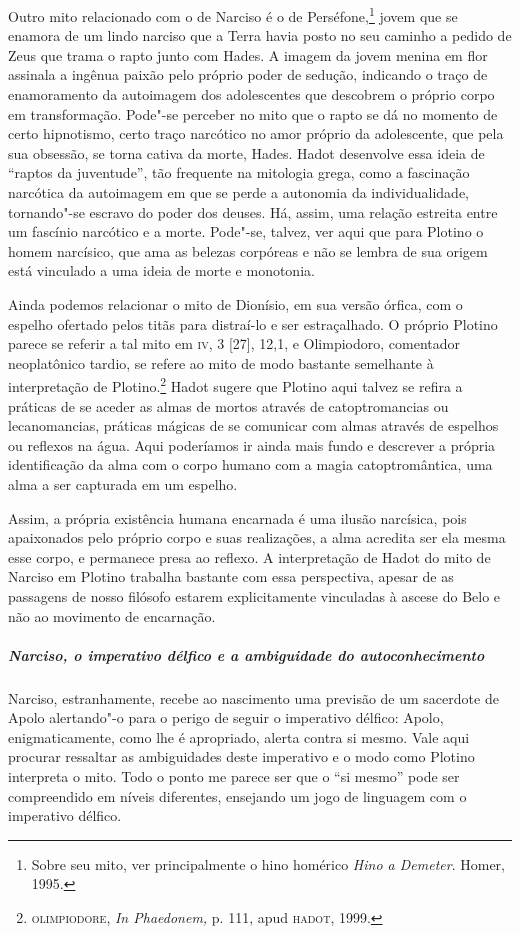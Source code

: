 Outro mito relacionado com o de Narciso é o de Perséfone,\footnote{
Sobre seu mito, ver principalmente o hino homérico \emph{Hino a
Demeter}. Homer, 1995.} jovem que se enamora de um lindo narciso que
a Terra havia posto no seu caminho a pedido de Zeus que trama o rapto
junto com Hades. A imagem da jovem menina em flor assinala a ingênua
paixão pelo próprio poder de sedução, indicando o traço de
enamoramento da autoimagem dos adolescentes que descobrem o próprio
corpo em transformação. Pode"-se perceber no mito que o rapto se dá no
momento de certo hipnotismo, certo traço narcótico no amor próprio da
adolescente, que pela sua obsessão, se torna cativa da morte, Hades.
Hadot desenvolve essa ideia de “raptos da juventude”, tão frequente
na mitologia grega, como a fascinação narcótica da autoimagem em que
se perde a autonomia da individualidade, tornando"-se escravo do poder
dos deuses. Há, assim, uma relação estreita entre um fascínio
narcótico e a morte. Pode"-se, talvez, ver aqui que para Plotino o
homem narcísico, que ama as belezas corpóreas e não se lembra de sua
origem está vinculado a uma ideia de morte e monotonia.

Ainda podemos relacionar o mito de Dionísio, em sua versão
órfica,
com o espelho ofertado pelos titãs para distraí-lo e ser
estraçalhado. O próprio Plotino parece se referir a tal mito em
\textsc{iv}, 3
[27], 12,1, e Olimpiodoro, comentador neoplatônico tardio, se refere
ao mito de modo bastante semelhante à interpretação de
Plotino.\footnote{ \textsc{olimpiodore}, \emph{In Phaedonem,} p. 111, apud
\textsc{hadot}, 1999.} Hadot sugere que Plotino aqui talvez se refira a
práticas de se aceder as almas de mortos através de catoptromancias ou
lecanomancias, práticas mágicas de se comunicar com almas através de
espelhos ou reflexos na água. Aqui poderíamos ir ainda mais fundo e
descrever a própria identificação da alma com o corpo humano com a
magia catoptromântica, uma alma a ser capturada em um espelho. 

Assim, a própria existência humana encarnada é uma ilusão
narcísica, pois apaixonados pelo próprio corpo e suas realizações, a
alma acredita ser ela mesma esse corpo, e permanece presa ao reflexo.
A interpretação de Hadot do mito de Narciso em Plotino trabalha
bastante com essa perspectiva, apesar de as passagens de nosso
filósofo estarem explicitamente vinculadas à ascese do Belo e não ao
movimento de encarnação.

\subparagraph{Narciso, o imperativo délfico e a ambiguidade do autoconhecimento}
Narciso, estranhamente, recebe ao nascimento uma previsão de um
sacerdote de Apolo alertando"-o para o perigo de seguir o imperativo
délfico: Apolo, enigmaticamente, como lhe é apropriado, alerta contra
si mesmo. Vale aqui procurar ressaltar as ambiguidades deste
imperativo e o modo como Plotino interpreta o mito. Todo o ponto me
parece ser que o “si mesmo” pode ser compreendido em níveis
diferentes, ensejando um jogo de linguagem com o imperativo délfico. 

